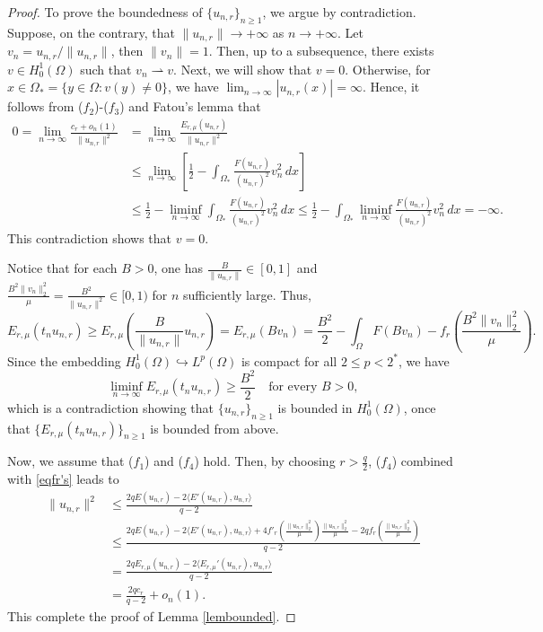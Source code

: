 \documentclass[11pt]{amsart}
\newcommand{\norm}[1]{\lVert#1\rVert}
\numberwithin{equation}{section}
\begin{document}
\begin{proof}
To prove the boundedness of $\{u_{n,r}\}_{n\geq 1}$, we argue by contradiction. Suppose, on the contrary,  that $\norm{u_{n,r}}\to+\infty$ as $n \to +\infty$. Let $v_n=u_{n,r}/\norm{u_{n,r}}$, then $\norm{v_n}=1$. Then, up to a subsequence, there exists $v \in H^1_0(\Omega)$ such that $v_n \rightharpoonup v$. Next, we will show that $v = 0$. Otherwise, for $x\in \Omega_*=\{y\in\Omega:v(y)\neq 0\}$, we have $\displaystyle \lim_{n\to\infty}|u_{n,r}(x)|=\infty$. Hence, it follows from ($f_2$)-($f_3$) and Fatou's lemma that
\begin{equation*}
    \begin{aligned}
0 =\lim_{n\to\infty}\frac{c_r+o_n(1)}{\norm{u_{n,r}}^2}&=\lim_{n\to\infty}\frac{E_{r,\mu}(u_{n,r})}{\norm{u_{n,r}}^2} \\
&\leq \lim_{n\to\infty}\left[\frac{1}{2}-\int_{\Omega_*}\frac{F(u_{n,r})}{(u_{n,r})^2}v_n^2\,dx\right] \\
&\leqslant\frac{1}{2}-\liminf_{n\to\infty}\int_{\Omega_*}\frac{F(u_{n,r})}{(u_{n,r})^2}v_n^2\,dx
\leqslant\frac{1}{2}-\int_{\Omega_*}\liminf_{n\to\infty}\frac{F(u_{n,r})}{(u_{n,r})^2}v_n^2\,dx
=-\infty.
\end{aligned}
\end{equation*}
This contradiction shows that $v=0$.

Notice that for each $B > 0$, one has $\frac{B}{\|u_{n,r}\|} \in [0, 1]$ and $\frac{B^2\norm{v_{n}}_2^2}{\mu}= \frac{B^2}{\norm{u_{n,r}}^2}\in [0,1)$ for $n$ sufficiently large. Thus,
$$E_{r,\mu}(t_n u_{n,r}) \geq E_{r,\mu} \left( \frac{B}{\|u_{n,r}\|} u_{n,r} \right) = E_{r,\mu}(B v_n) = \frac{B^2}{2} - \int_{\Omega} F(B v_n)- f_r\left(\frac{ B^2\norm{v_{n}}_2^2}{\mu}\right).$$
Since the embedding $H^1_0(\Omega)\hookrightarrow L^p(\Omega)$ is compact for all $2\leq p<2^*$, we have
$$\liminf_{n \to \infty} E_{r,\mu}(t_n u_{n,r}) \geq \frac{B^2}{2} \quad \text{for every } B > 0,$$
which is a contradiction showing that $\{u_{n,r}\}_{n \geq 1}$ is bounded in $H^1_0(\Omega)$, once that $\{E_{r,\mu}(t_n u_{n,r})\}_{n \geq 1}$ is bounded from above.

Now, we assume that ($f_1$) and ($f_4$) hold. Then, by choosing $r>\frac{q}{2}$, ($f_4$) combined with \eqref{eqfr's} leads to
    $$
    \begin{aligned}
            \norm{u_{n,r}}^2 &\leq \frac{2qE(u_{n,r})-2\langle E'(u_{n,r}),u_{n,r}\rangle}{q-2}\\
            &\leq \frac{2qE(u_{n,r})-2\langle E'(u_{n,r}),u_{n,r}\rangle+4f'_r\left(\frac{\norm{u_{n,r}}_2^2}{\mu}\right)\frac{\norm{u_{n,r}}^2_{2}}{\mu} -2qf_r\left(\frac{ \norm{u_{n,r}}_2^2}{\mu}\right)}{q-2}\\
            &=\frac{2qE_{r,\mu}(u_{n,r})-2\langle E_{r,\mu}'(u_{n,r}),u_{n,r}\rangle}{q-2}\\
            &=\frac{2qc_r}{q-2}+o_n(1).
    \end{aligned}
    $$
This complete the proof of Lemma \ref{lembounded}.

\end{proof}
\end{document}
